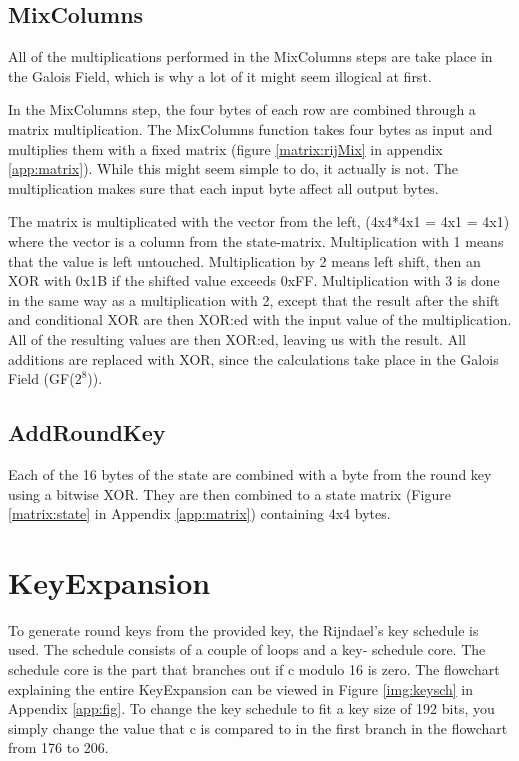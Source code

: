 \subsection{MixColumns} \label{sec:MixColumns}
All of the multiplications performed in the MixColumns steps are 
take place in the Galois Field, which is why a lot of it might seem
illogical at first. 

In the MixColumns step, the four bytes of each row are combined 
through a matrix multiplication. The MixColumns function takes four 
bytes as input and multiplies them with a fixed matrix (figure 
\ref{matrix:rijMix} in appendix \ref{app:matrix}). While this might 
seem simple to do, it actually is not. The multiplication makes sure 
that each input byte affect all output bytes. \citep{Angelfire}

The matrix is multiplicated with the vector from the left, (4x4*4x1 = 
4x1 = 4x1) where the vector is a column from the 
state-matrix. Multiplication with 1 means that the value is left 
untouched. Multiplication by 2 means left shift, then an XOR with 0x1B 
if the shifted value exceeds 0xFF. Multiplication with 3 is done in 
the same way as a multiplication with 2, except that the result after 
the shift and conditional XOR are then XOR:ed with the input value of 
the multiplication. All of the resulting values are then XOR:ed, 
leaving us with the result. All additions are replaced with XOR, since 
the calculations take place in the Galois Field (GF(\(2^8\))).

\subsection{AddRoundKey}\label{sec:AddRoundKey}
Each of the 16 bytes of the state are combined with a byte from the 
round key using a bitwise XOR. They are then combined to a state 
matrix (Figure \ref{matrix:state} in Appendix \ref{app:matrix}) 
containing 4x4 bytes.

\section{KeyExpansion}\label{sec:KeySch}
To generate round keys from the provided key, the Rijndael's key 
schedule is used. The schedule consists of a couple of loops and a key-
schedule core. The schedule core is the part that branches out if c 
modulo 16 is zero. The flowchart explaining the entire KeyExpansion 
can be viewed in Figure \ref{img:keysch} in Appendix \ref{app:fig}. 
To change the key schedule to fit a key size of 192 bits, you simply 
change the value that c is compared to in the first branch in the 
flowchart from 176 to 206.

